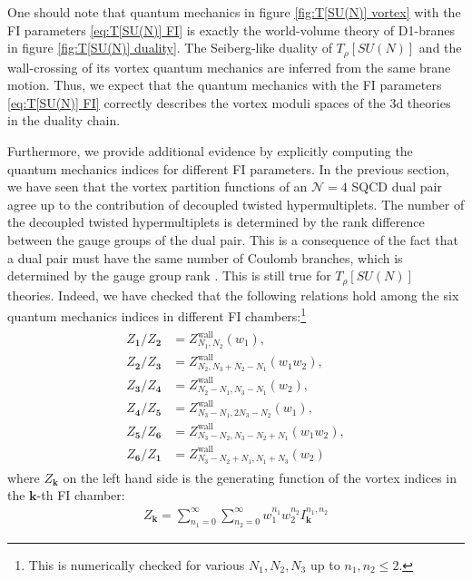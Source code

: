 \documentclass[a4paper,11pt]{article}
\begin{document}
One should note that quantum mechanics in figure \ref{fig:T[SU(N)] vortex} with the FI parameters \eqref{eq:T[SU(N)] FI} is exactly the world-volume theory of D1-branes in figure \ref{fig:T[SU(N)] duality}. The Seiberg-like duality of $T_\rho [SU(N)]$ and the wall-crossing of its vortex quantum mechanics are inferred from the same brane motion. Thus, we expect that the quantum mechanics with the FI parameters \eqref{eq:T[SU(N)] FI} correctly describes the vortex moduli spaces of the 3d theories in the duality chain.

Furthermore, we provide additional evidence by explicitly computing the quantum mechanics indices for different FI parameters. In the previous section, we have seen that the vortex partition functions of an $\mathcal N = 4$ SQCD dual pair agree up to the contribution of decoupled twisted hypermultiplets. The number of the decoupled twisted hypermultiplets is determined by the rank difference between the gauge groups of the dual pair. This is a consequence of the fact that a dual pair must have the same number of Coulomb branches, which is determined by the gauge group rank \cite{Gaiotto:2008ak,Kim:2012uz,Yaakov:2013fza,Gaiotto:2013bwa}. This is still true for $T_\rho [SU(N)]$ theories. Indeed, we have checked that the following relations hold among the six quantum mechanics indices in different FI chambers:\footnote{This is numerically checked for various $N_1,N_2,N_3$ up to $n_1,n_2 \leq 2$.}
\begin{align}
\begin{aligned}
\label{eq:T[SU(N)] wc}
Z_{\mathbf 1}/Z_{\mathbf 2} &= Z^\text{wall}_{N_1,N_2} (w_1), \\
Z_{\mathbf 2}/Z_{\mathbf 3} &= Z^\text{wall}_{N_2,N_3+N_2-N_1} (w_1 w_2), \\
Z_{\mathbf 3}/Z_{\mathbf 4} &= Z^\text{wall}_{N_2-N_1,N_3-N_1} (w_2), \\
Z_{\mathbf 4}/Z_{\mathbf 5} &= Z^\text{wall}_{N_3-N_1,2 N_3-N_2} (w_1), \\
Z_{\mathbf 5}/Z_{\mathbf 6} &= Z^\text{wall}_{N_3-N_2,N_3-N_2+N_1} (w_1 w_2), \\
Z_{\mathbf 6}/Z_{\mathbf 1} &= Z^\text{wall}_{N_3-N_2+N_1,N_1+N_3} (w_2)
\end{aligned}
\end{align}
where $Z_{\mathbf k}$ on the left hand side is the generating function of the vortex indices in the $\mathbf k$-th FI chamber:
\begin{align}
Z_{\mathbf k} = \sum_{n_1 = 0}^\infty \sum_{n_2 = 0}^\infty w_1^{n_1} w_2^{n_2} I_{\mathbf k}^{n_1,n_2}
\end{align}
\end{document}
